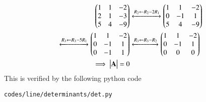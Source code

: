 %
\begin{align}
\begin{pmatrix}1 & 1 & -2\\
2 & 1 & -3\\
5 & 4 & -9
\end{pmatrix}
&\xleftrightarrow[]{R_2 \leftarrow R_2 - 2R_1}
\begin{pmatrix}1 & 1 & -2\\
0 & -1 & 1\\
5 & 4 & -9
\end{pmatrix}\\
\xleftrightarrow[]{R_3 \leftarrow R_3 - 5R_1}
\begin{pmatrix}1 & 1 & -2\\
0 & -1 & 1\\
0 & -1 & 1
\end{pmatrix}
&\xleftrightarrow[]{R_3 \leftarrow R_3 - R_2}
\begin{pmatrix}1 & 1 & -2\\
0 & -1 & 1\\
0 & 0 & 0
\end{pmatrix}
\\
\implies \begin{vmatrix}\mathbf{A}\end{vmatrix} = 0&
\end{align}
This is verified by the  following python code
\begin{lstlisting}
codes/line/determinants/det.py
\end{lstlisting}


